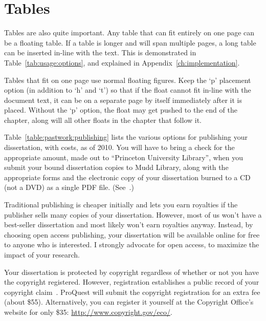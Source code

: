 \section{Tables}
\label{sec:pastwork:tables}

Tables are also quite important. Any table that can fit entirely on one page can be a floating table. If a table is longer and will span multiple pages, a long table can be inserted in-line with the text. This is demonstrated in Table~\ref{tab:usage:options}, and explained in Appendix~\ref{ch:implementation}.

Tables that fit on one page use normal floating figures. Keep the `p' placement option (in addition to `h' and `t') so that if the float cannot fit in-line with the document text, it can be on a separate page by itself immediately after it is placed. Without the `p' option, the float may get pushed to the end of the chapter, along will all other floats in the chapter that follow it.

Table~\ref{table:pastwork:publishing} lists the various options for publishing your dissertation, with costs, as of 2010. You will have to bring a check for the appropriate amount, made out to ``Princeton University Library'', when you submit your bound dissertation copies to Mudd Library, along with the appropriate forms and the electronic copy of your dissertation burned to a CD (not a DVD) as a single PDF file. (See~\cite{muddthesis2009}.)

Traditional publishing is cheaper initially and lets you earn royalties if the publisher sells many copies of your dissertation. However, most of us won't have a best-seller dissertation and most likely won't earn royalties anyway. Instead, by choosing open access publishing, your dissertation will be available online for free to anyone who is interested. I strongly advocate for open access, to maximize the impact of your research.

Your dissertation is protected by copyright regardless of whether or not you have the copyright registered. However, registration establishes a public record of your copyright claim~\cite{muddthesis2009}. ProQuest will submit the copyright registration for an extra fee (about \$55). Alternatively, you can register it yourself at the Copyright Office's website for only \$35: \url{http://www.copyright.gov/eco/}.

